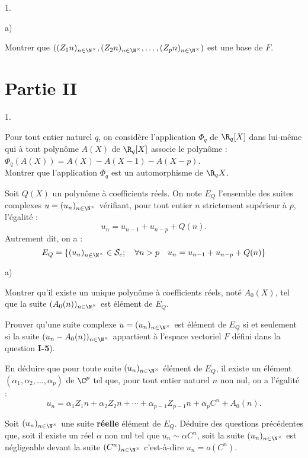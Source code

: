 \documentclass[11pt]{article}%
\begin{document}
\begin{noliste}{1.}
\begin{noliste}{a)}
\item Montrer que $((Z_{1}{n})_{n\in \N^{\times
}},(Z_{2}{n})_{n\in \N^{\times }},\dots,(Z_{p}{n})_{n\in \N^{\times
}})$ est une base de $F$.
\end{noliste}
\end{noliste}

\section*{Partie II}

\begin{noliste}{1.}
 \setlength{\itemsep}{4mm}
\item Pour tout entier naturel $q$, on considère l'application
$\Phi_{q}$
de $\R_{q}[X]$ dans lui-même qui à tout polynôme $A(X)$ de $\R_{q}[X]$
associe le polynôme : $\Phi_{q}(A(X)) = A(X)-A(X-1)-A(X-p)$.\\
Montrer que l'application $\Phi_{q}$ est un automorphisme de $\R_{q}X$.

\item Soit $Q(X)$ un polynôme à coefficients réels. On note $E_{Q}$
l'ensemble des suites complexes $u = (u_{n})_{n\in \N^{\times }}$
vérifiant, pour tout entier $n$ strictement supérieur à $p$, l'égalité
:
\[
u_{n} = u_{n-1} + u_{n-p} + Q(n).
\]
Autrement dit, on a : 
\[
E_{Q} = \{(u_{n})_{n\in \N^{\times }}\in \mathcal{S}_{c};\quad \forall
n>p\quad u_{n} = u_{n-1} + u_{n-p} + Q(n)\}
\]

\begin{noliste}{a)}
 \setlength{\itemsep}{2mm}
\item Montrer qu'il existe un unique polynôme à coefficients réels,
noté $A_{0}(X)$, tel que la suite $(A_{0}(n))_{n\in \N^{\times }}$ est
élément de $E_{Q}$.

\item Prouver qu'une suite complexe $u = (u_{n})_{n\in \N^{\times }}$
est élément de $E_{Q}$ si et seulement si la suite
$(u_{n}-A_{0}(n))_{n\in 
\N^{\times }}$ appartient à l'espace vectoriel $F$ défini dans la
question \textbf{I-5}).

\item En déduire que pour toute suite $(u_{n})_{n\in \N^{\times }}$
élément de $E_{Q}$, il existe un élément
$(\alpha_{1},\alpha_{2},\dots,\alpha_{p})$ de $\C^{p}$ tel que, pour
tout entier naturel $n$ non
nul, on a l'égalité :
\[
u_{n} = \alpha_{1}Z_{1}{n} + \alpha_{2}Z_{2}{n} + \cdots + \alpha
_{p-1}Z_{p-1}{n} + \alpha_{p}C^{n} + A_{0}(n).
\]

\item Soit $(u_{n})_{n\in \N^{\times }}$ une suite \textbf{réelle}
élément de $E_{Q}$. Déduire des questions précédentes que, soit il
existe un réel $\alpha $ non nul tel que $u_{n}\sim \alpha C^{n}$, soit
la suite $(u_{n})_{n\in \N^{\times }}$ est négligeable devant la suite
$(C^{n})_{n\in \N^{\times }}$ c'est-à-dire $u_{n} = o(C^{n})$.
\end{noliste}


\end{noliste}
\end{document}
